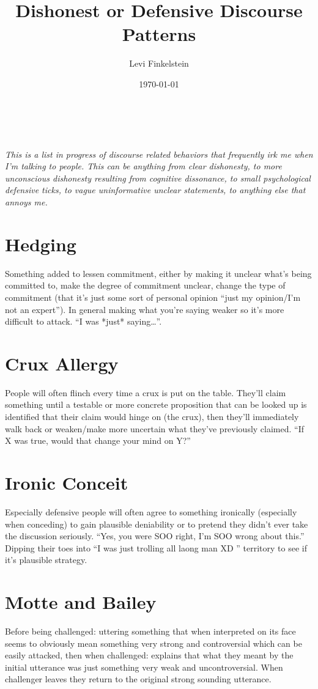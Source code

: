 \documentclass[12pt,english]{article}
\title{Dishonest or Defensive Discourse Patterns}
\author{Levi Finkelstein}
\date{\today}
\begin{document}
\maketitle
\\\\
\it{This is a list in progress of discourse related behaviors that frequently irk me when I'm talking to people. This can be anything from clear dishonesty, to more unconscious dishonesty resulting from cognitive dissonance, to small  psychological defensive ticks, to vague uninformative unclear statements, to anything else that annoys me.}

\section*{Hedging} Something added to lessen commitment, either by making it unclear what’s being committed to, make the degree of commitment unclear, change the type of commitment (that it’s just some sort of personal opinion “just my opinion/I’m not an expert”). In general making what you’re saying weaker so it’s more difficult to attack. “I was *just* saying…”.

\section*{Crux Allergy} People will often flinch every time a crux is put on the table. They’ll claim something until a testable or more concrete proposition that can be looked up is identified that their claim would hinge on (the crux), then they’ll immediately walk back or weaken/make more uncertain what they’ve previously claimed. “If X was true, would that change your mind on Y?”

\section*{Ironic Conceit} Especially defensive people will often agree to something ironically (especially when conceding) to gain plausible deniability or to pretend they didn’t ever take the discussion seriously. “Yes, you were SOO right, I’m SOO wrong about this.” Dipping their toes into “I was just trolling all laong man XD '' territory to see if it’s plausible strategy.

\section*{Motte and Bailey} Before being challenged: uttering something that when interpreted on its face seems to obviously mean something very strong and controversial which can be easily attacked, then when challenged: explains that what they meant by the initial utterance was just something very weak and uncontroversial. When challenger leaves they return to the original strong sounding utterance. 
\end{document}
